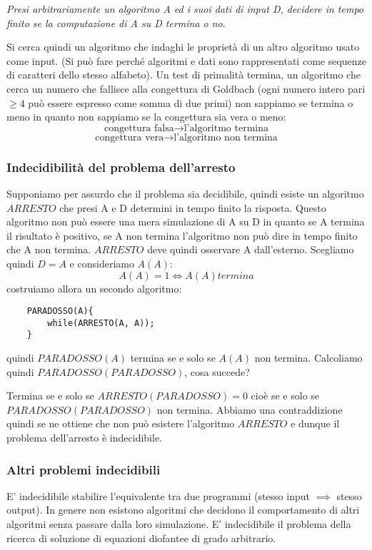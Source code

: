 \emph{Presi arbitrariamente un algoritmo A ed i suoi dati di input D, decidere in tempo finito se la computazione di A su D termina o no}.

Si cerca quindi un algoritmo che indaghi le proprietà di un altro algoritmo usato come input. (Si può fare perché algoritmi e dati sono rappresentati come sequenze di caratteri dello stesso alfabeto). Un test di primalità termina, un algoritmo che cerca un numero che fallisce alla congettura di Goldbach (ogni numero intero pari $\geq 4$ può essere espresso come somma di due primi) non sappiamo se termina o meno in quanto non sappiamo se la congettura sia vera o meno:
$$ \text{congettura falsa} \longrightarrow \text{l'algoritmo termina} $$
$$ \text{congettura vera} \longrightarrow \text{l'algoritmo non termina} $$

\subsubsection{Indecidibilità del problema dell'arresto}
Supponiamo per assurdo che il problema sia decidibile, quindi esiste un algoritmo $ARRESTO$ che presi A e D determini in tempo finito la risposta.
Questo algoritmo non può essere una mera simulazione di A su D in quanto se A termina il risultato è positivo, se A non termina l'algoritmo non può dire in tempo finito che A non termina. $ARRESTO$ deve quindi osservare A dall'esterno. Scegliamo quindi $D=A$ e consideriamo $A(A)$:
$$ A(A) = 1 \Longleftrightarrow A(A) termina $$
costruiamo allora un secondo algoritmo:
\begin{verbatim}
    PARADOSSO(A){
        while(ARRESTO(A, A));
    }
\end{verbatim}
quindi $PARADOSSO(A)$ termina se e solo se $A(A)$ non termina.
Calcoliamo quindi $PARADOSSO(PARADOSSO)$, cosa succede?

Termina se e solo se $ARRESTO(PARADOSSO) = 0$ cioè se e solo se $PARADOSSO(PARADOSSO)$ non termina.
Abbiamo una contraddizione quindi se ne ottiene che non può esistere l'algoritmo $ARRESTO$ e dunque il problema dell'arresto è indecidibile.

\subsubsection{Altri problemi indecidibili}
E' indecidibile stabilire l'equivalente tra due programmi (stesso input $\implies$ stesso output).
In genere non esistono algoritmi che decidono il comportamento di altri algoritmi senza passare dalla loro simulazione. E' indecidibile il problema della ricerca di soluzione di equazioni diofantee di grado arbitrario.

